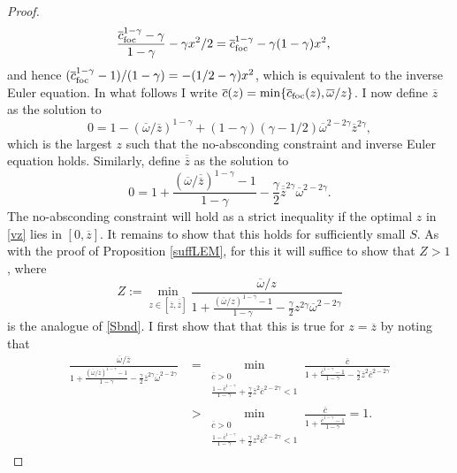 \documentclass[11pt]{article}
\theoremstyle{plain}
\theoremstyle{definition} %
\begin{document}
\begin{proof}
\begin{align*}
\frac{\overline{c}_{\textnormal{foc}}^{1 - \gamma} - \gamma}{1 - \gamma} - \gamma x^2/2 & = \overline{c}_{\textnormal{foc}}^{1 - \gamma} - \gamma (1 - \gamma) x^2,
\end{align*}
and hence $(\overline{c}_{\textnormal{foc}}^{1-\gamma} - 1)/(1 - \gamma) = - (1/2 - \gamma) x^2$, which is equivalent to the inverse Euler equation. In what follows I write $\overline{c}(z) = \min\{\overline{c}_{\textnormal{foc}}(z), \overline{\omega}/z\}$. I now define $\overline{z}$ as the solution to 
\begin{equation}
0 = 1 - (\overline{\omega}/\overline{z})^{1-\gamma} + (1-\gamma)(\gamma-1/2)\overline{\omega}^{2-2\gamma}\overline{z}^{2\gamma},
\label{zbar}
\end{equation}
which is the largest $z$ such that the no-absconding constraint and inverse Euler equation holds. Similarly, define $\overline{\overline{z}}$ as the solution to 
$$
0 = 1 + \frac{(\overline{\omega}/\overline{\overline{z}})^{1-\gamma}-1}{1-\gamma} - \frac{\gamma}{2} \overline{\overline{z}}^{2\gamma} \overline{\omega}^{2-2\gamma}.
$$
The no-absconding constraint will hold as a strict inequality if the optimal $z$ in \eqref{vz} lies in $[0, \overline{z}]$. It remains to show that this holds for sufficiently small $S$. As with the proof of Proposition \ref{suffLEM}, for this it will suffice to show that $Z>1$, where 
\begin{equation}
Z := \min_{z \in [\overline{z}, \overline{\overline{z}}]} \frac{\overline{\omega}/z}{1 + \frac{(\overline{\omega}/z)^{1-\gamma}-1}{1-\gamma} - \frac{\gamma}{2} z^{2\gamma} \overline{\omega}^{2-2\gamma}}
\label{Zgamma}
\end{equation}
is the analogue of \eqref{Sbnd}. I first show that that this is true for $z=\overline{z}$ by noting that
\begin{equation}
\begin{aligned}
\frac{\overline{\omega}/\overline{z}}{1 + \frac{(\overline{\omega}/\overline{z})^{1-\gamma}-1}{1-\gamma} - \frac{\gamma}{2} \overline{z}^{2\gamma} \overline{\omega}^{2-2\gamma}} & = \min_{\substack{\overline{c} > 0 \\ \frac{1-\overline{c}^{1-\gamma}}{1-\gamma} + \frac{\gamma}{2} \overline{z}^2 \overline{c}^{2-2\gamma} < 1}} \frac{\overline{c}}{1 + \frac{\overline{c}^{1-\gamma}-1}{1-\gamma} - \frac{\gamma}{2} \overline{z}^2 \overline{c}^{2-2\gamma}}
\\ & > \min_{\substack{\overline{c} > 0 \\ \frac{1-\overline{c}^{1-\gamma}}{1-\gamma} + \frac{\gamma}{2} z^2 \overline{c}^{2-2\gamma} < 1}} \frac{\overline{c}}{1 + \frac{\overline{c}^{1-\gamma}-1}{1-\gamma}} = 1.

\end{aligned}
\end{equation}
\end{proof}
\end{document}
